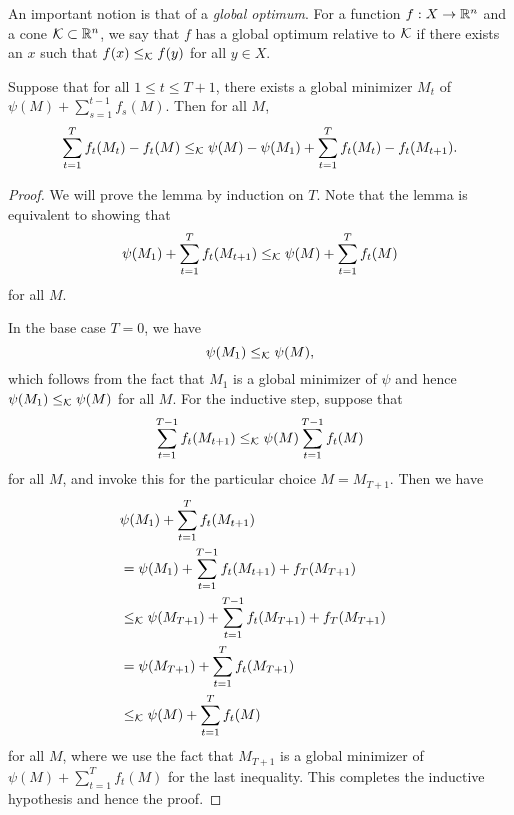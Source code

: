 \documentclass[paper_icml.tex]{subfiles}
\begin{document}
An important notion is that of a \emph{global optimum}. For a function $f : X \to \mathbb{R}^n$ 
and a cone $\mathcal{K} \subset \mathbb{R}^n$, we say that $f$ has a global optimum relative to 
$\mathcal{K}$ if there exists an $x$ such that $f(x) \leq_{\mathcal{K}} f(y)$ for all $y \in X$.

\begin{lemma}
\label{lem:ftrl-k}
Suppose that for all $1 \leq t \leq T+1$, there 
exists a global minimizer $M_t$ of 
$\psi(M) + \sum_{s=1}^{t-1} f_s(M)$. Then for all $M$,
\begin{dmath} \sum_{t=1}^T f_t(M_t)-f_t(M) \leq_{\sK} \psi(M) - \psi(M_1) + \sum_{t=1}^T f_t(M_{t}) - f_t(M_{t+1}). \end{dmath}
\end{lemma}
\begin{proof}
We will prove the lemma by induction on $T$. Note that the lemma is equivalent to showing that 
\[ \psi(M_1) + \sum_{t=1}^T f_t(M_{t+1}) \leq_{\mathcal{K}} \psi(M) + \sum_{t=1}^T f_t(M) \]
for all $M$.

In the base case $T = 0$, we have
\[ \psi(M_1) \leq_{\mathcal{K}} \psi(M), \]
which follows from the fact that $M_1$ is a global minimizer of $\psi$ and 
hence $\psi(M_1) \leq_{\mathcal{K}} \psi(M)$ for all $M$. For the inductive step, suppose that
\[ \sum_{t=1}^{T-1} f_t(M_{t+1}) \leq_{\mathcal{K}} \psi(M) \sum_{t=1}^{T-1} f_t(M) \]
for all $M$, and invoke this for the particular choice $M = M_{T+1}$. Then we have
\begin{align*}
\lefteqn{\psi(M_1) + \sum_{t=1}^T f_t(M_{t+1})} \\
 &= \psi(M_1) + \sum_{t=1}^{T-1} f_t(M_{t+1}) + f_T(M_{T+1}) \\
 &\leq_{\sK} \psi(M_{T+1}) + \sum_{t=1}^{T-1} f_t(M_{T+1}) + f_T(M_{T+1}) \\
 &= \psi(M_{T+1}) + \sum_{t=1}^T f_t(M_{T+1}) \\
 &\leq_{\sK} \psi(M) + \sum_{t=1}^T f_t(M)
\end{align*}
for all $M$, where we use the fact that $M_{T+1}$ is a global minimizer of $\psi(M) + \sum_{t=1}^T f_t(M)$ for 
the last inequality. This completes the inductive hypothesis and hence the proof.
\end{proof}
\end{document}
